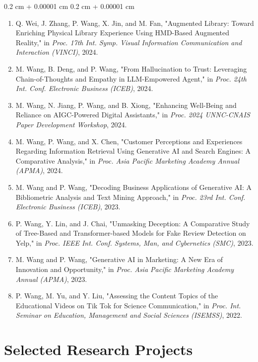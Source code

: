\documentclass[10pt, letterpaper]{article}
\newenvironment{onecolentry}{
    \begin{adjustwidth}{
        0.2 cm + 0.00001 cm
    }{
        0.2 cm + 0.00001 cm
    }
}{
    \end{adjustwidth}
} %
\begin{document}
        \begin{onecolentry}
            \begin{enumerate}
                \item Q. Wei, J. Zhang, P. Wang, X. Jin, and M. Fan, "Augmented Library: Toward Enriching Physical Library Experience Using HMD-Based Augmented Reality," in \textit{Proc. 17th Int. Symp. Visual Information Communication and Interaction (VINCI)}, 2024.
                \item M. Wang, B. Deng, and P. Wang, "From Hallucination to Trust: Leveraging Chain-of-Thoughts and Empathy in LLM-Empowered Agent," in \textit{Proc. 24th Int. Conf. Electronic Business (ICEB)}, 2024.
                \item M. Wang, N. Jiang, P. Wang, and B. Xiong, "Enhancing Well-Being and Reliance on AIGC-Powered Digital Assistants," in \textit{Proc. 2024 UNNC-CNAIS Paper Development Workshop}, 2024.
                \item M. Wang, P. Wang, and X. Chen, "Customer Perceptions and Experiences Regarding Information Retrieval Using Generative AI and Search Engines: A Comparative Analysis," in \textit{Proc. Asia Pacific Marketing Academy Annual (APMA)}, 2024.
                \item M. Wang and P. Wang, "Decoding Business Applications of Generative AI: A Bibliometric Analysis and Text Mining Approach," in \textit{Proc. 23rd Int. Conf. Electronic Business (ICEB)}, 2023.
                \item P. Wang, Y. Lin, and J. Chai, "Unmasking Deception: A Comparative Study of Tree-Based and Transformer-based Models for Fake Review Detection on Yelp," in \textit{Proc. IEEE Int. Conf. Systems, Man, and Cybernetics (SMC)}, 2023.
                \item M. Wang and P. Wang, "Generative AI in Marketing: A New Era of Innovation and Opportunity," in \textit{Proc. Asia Pacific Marketing Academy Annual (APMA)}, 2023.
                \item P. Wang, M. Yu, and Y. Liu, "Assessing the Content Topics of the Educational Videos on Tik Tok for Science Communication," in \textit{Proc. Int. Seminar on Education, Management and Social Sciences (ISEMSS)}, 2022.
            \end{enumerate}
        \end{onecolentry}

    \section{Selected Research Projects}
\end{document}
